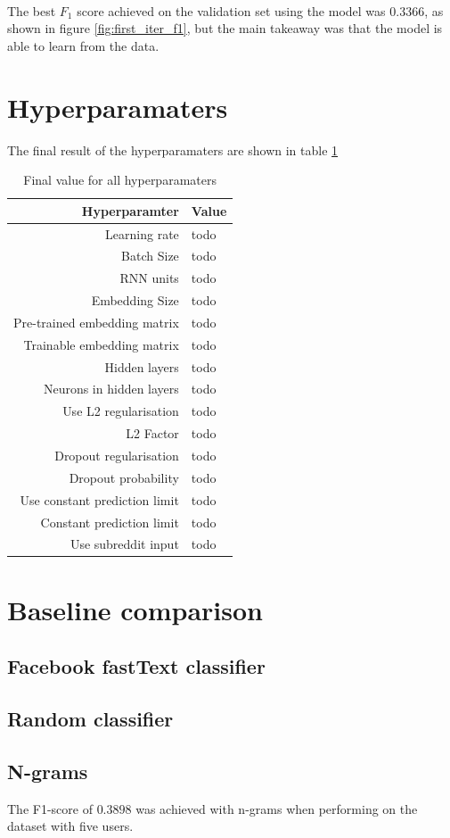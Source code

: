 \\
The best $F_1$ score achieved on the validation set using the model was $0.3366$, as shown in figure \ref{fig:first_iter_f1}, but the main takeaway was that the model is able to learn from the data.

\section{Hyperparamaters}
The final result of the hyperparamaters are shown in table \ref{table:hyperparameters_final}

\begin{table}[h!]
    \centering
    \begin{tabular}{ r  p{7cm} }
        \hline
        \textbf{Hyperparamter}  &  \textbf{Value} \\ \hline \hline
        Learning rate & todo  \\ \hline
        Batch Size & todo \\ \hline
        RNN units & todo  \\ \hline
        Embedding Size & todo \\ \hline
        Pre-trained embedding matrix & todo \\ \hline
        Trainable embedding matrix & todo \\ \hline
        Hidden layers & todo \\ \hline
        Neurons in hidden layers & todo \\ \hline
        Use L2 regularisation & todo \\ \hline
        L2 Factor & todo \\ \hline
        Dropout regularisation & todo\\ \hline
        Dropout probability & todo \\ \hline
        Use constant prediction limit & todo \\ \hline
        Constant prediction limit & todo  \\ \hline
        Use subreddit input & todo \\ \hline
    \end{tabular}
    \caption{Final value for all hyperparamaters}
    \label{table:hyperparameters_final}
\end{table}
\section{Baseline comparison} 
\subsection{Facebook fastText classifier}

\subsection{Random classifier}

\subsection{N-grams}
The F1-score of $0.3898$ was achieved with n-grams when performing on the dataset with five users.


